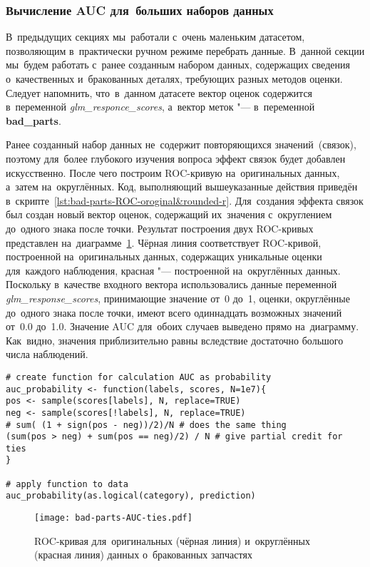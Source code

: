 \documentclass[]{scrreprt}
\begin{document}
\subsubsection{Вычисление AUC для~больших наборов данных}
В~предыдущих секциях мы~работали с~очень маленьким датасетом, позволяющим в~практически ручном режиме перебрать данные. В~данной секции мы~будем работать с~ранее созданным набором данных, содержащих сведения о~качественных и~бракованных деталях, требующих разных методов оценки. Следует напомнить, что~в~данном датасете вектор оценок содержится в~переменной \textit{glm\_responce\_scores}, а~вектор меток "--- в~переменной \textbf{bad\_parts}.

Ранее созданный набор данных не~содержит повторяющихся значений~(связок), поэтому для~более глубокого изучения вопроса эффект связок будет добавлен искусственно. После чего построим ROC-кривую на~оригинальных данных, а~затем на~округлённых. Код, выполняющий вышеуказанные действия приведён в~скрипте~\ref{lst:bad-parts-ROC-oroginal&rounded-r}. Для~создания эффекта связок был создан новый вектор оценок, содержащий их~значения с~округлением до~одного знака после точки. Результат построения двух ROC-кривых представлен на~диаграмме~\ref{fig:bad-parts-ROC-original&rounded-r}. Чёрная линия соответствует ROC-кривой, построенной на~оригинальных данных, содержащих уникальные оценки для~каждого наблюдения, красная "--- построенной на~округлённых данных. Поскольку в~качестве входного вектора использовались данные переменной \textit{glm\_response\_scores}, принимающие значение от~0 до~1, оценки, округлённые до~одного знака после точки, имеют всего одиннадцать возможных значений от~0.0 до~1.0. Значение AUC для~обоих случаев выведено прямо на~диаграмму. Как~видно, значения приблизительно равны вследствие достаточно большого числа наблюдений.
%
\begin{lstlisting}[float, caption = Построение ROC-кривой на~оригинальных (чёрная линия) и~округлённых (красная линия) данных о~бракованных запчастях, firstnumber=1, label= lst:bad-parts-ROC-oroginal&rounded-r]
# create function for calculation AUC as probability
auc_probability <- function(labels, scores, N=1e7){
pos <- sample(scores[labels], N, replace=TRUE)
neg <- sample(scores[!labels], N, replace=TRUE)
# sum( (1 + sign(pos - neg))/2)/N # does the same thing
(sum(pos > neg) + sum(pos == neg)/2) / N # give partial credit for ties
}

# apply function to data
auc_probability(as.logical(category), prediction)
\end{lstlisting}
%
\begin{figure}[ht]
	\centering
	\texttt{[image: bad-parts-AUC-ties.pdf]}
	\caption{ROC-кривая для~оригинальных (чёрная линия) и~округлённых (красная линия) данных о~бракованных запчастях}
	\label{fig:bad-parts-ROC-original&rounded-r}
\end{figure}
%
\end{document}
